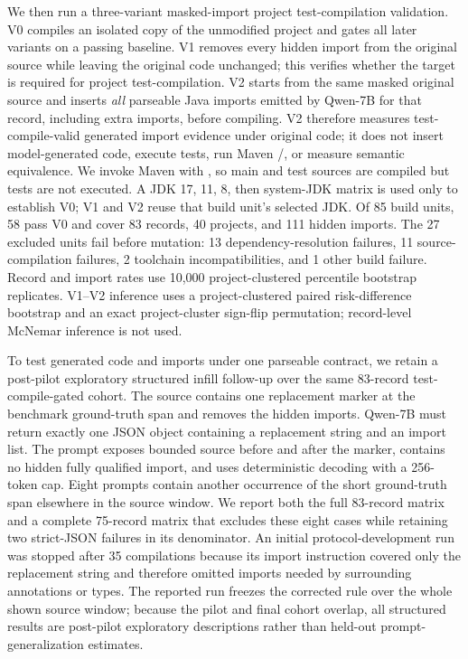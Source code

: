 \documentclass[pdflatex,sn-basic]{sn-jnl}
\newcommand{\codeid}[1]{\texttt{\detokenize{#1}}}
\begin{document}
We then run a three-variant masked-import project test-compilation validation. V0 compiles an isolated copy of the unmodified project and gates all later variants on a passing baseline. V1 removes every hidden import from the original source while leaving the original code unchanged; this verifies whether the target is required for project test-compilation. V2 starts from the same masked original source and inserts \emph{all} parseable Java imports emitted by Qwen-7B for that record, including extra imports, before compiling. V2 therefore measures test-compile-valid generated import evidence under original code; it does not insert model-generated code, execute tests, run Maven \codeid{package}/\codeid{verify}, or measure semantic equivalence. We invoke Maven \codeid{clean test-compile} with \codeid{maven.test.skip=false}, so main and test sources are compiled but tests are not executed. A JDK 17, 11, 8, then system-JDK matrix is used only to establish V0; V1 and V2 reuse that build unit's selected JDK. Of 85 build units, 58 pass V0 and cover 83 records, 40 projects, and 111 hidden imports. The 27 excluded units fail before mutation: 13 dependency-resolution failures, 11 source-compilation failures, 2 toolchain incompatibilities, and 1 other build failure. Record and import rates use 10,000 project-clustered percentile bootstrap replicates. V1--V2 inference uses a project-clustered paired risk-difference bootstrap and an exact project-cluster sign-flip permutation; record-level McNemar inference is not used.

To test generated code and imports under one parseable contract, we retain a post-pilot exploratory structured infill follow-up over the same 83-record test-compile-gated cohort. The source contains one replacement marker at the benchmark ground-truth span and removes the hidden imports. Qwen-7B must return exactly one JSON object containing a replacement string and an import list. The prompt exposes bounded source before and after the marker, contains no hidden fully qualified import, and uses deterministic decoding with a 256-token cap. Eight prompts contain another occurrence of the short ground-truth span elsewhere in the source window. We report both the full 83-record matrix and a complete 75-record matrix that excludes these eight cases while retaining two strict-JSON failures in its denominator. An initial protocol-development run was stopped after 35 compilations because its import instruction covered only the replacement string and therefore omitted imports needed by surrounding annotations or types. The reported run freezes the corrected rule over the whole shown source window; because the pilot and final cohort overlap, all structured results are post-pilot exploratory descriptions rather than held-out prompt-generalization estimates.
\end{document}
